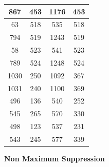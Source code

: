 \documentclass[12pt]{article}
\begin{document}
\begin{enumerate}
\begin{enumerate}
\begin{longtable}{|c|c|c|c|}
			867  & 453 & 1176 & 453  \\ \hline
			63   & 518 & 535  & 518  \\ \hline
			794  & 519 & 1243 & 519  \\ \hline
			58   & 523 & 541  & 523  \\ \hline
			789  & 524 & 1248 & 524  \\ \hline
			1030 & 250 & 1092 & 367  \\ \hline
			1031 & 240 & 1100 & 369  \\ \hline
			496  & 136 & 540  & 252  \\ \hline
			545  & 265 & 570  & 330  \\ \hline
			498  & 123 & 537  & 231  \\ \hline
			543  & 245 & 577  & 339  \\ \hline
		\end{longtable}

	\end{enumerate}
	\end{enumerate}
\pagebreak
\textbf{Non Maximum Suppression }
\end{document}
